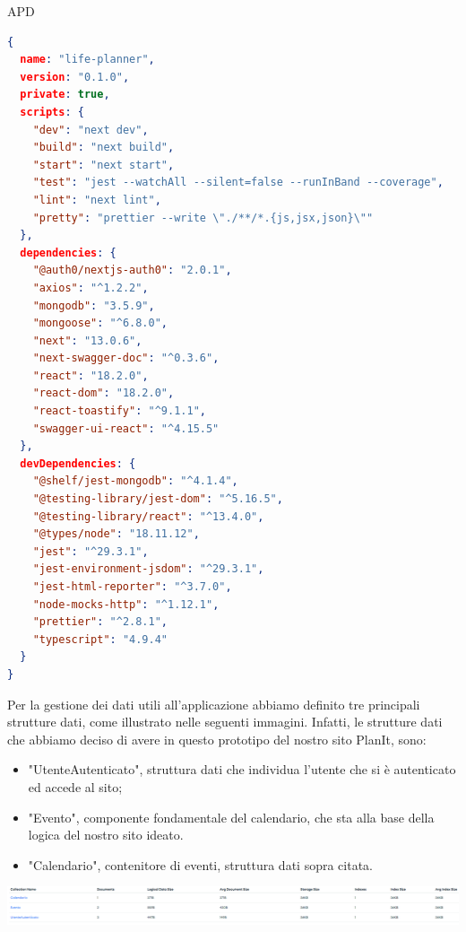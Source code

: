 \begin{listaPersonale} {APD}
    \begin{lstlisting}[language=json,firstnumber=1]
{
  name: "life-planner",
  version: "0.1.0",
  private: true,
  scripts: {
    "dev": "next dev",
    "build": "next build",
    "start": "next start",
    "test": "jest --watchAll --silent=false --runInBand --coverage",
    "lint": "next lint",
    "pretty": "prettier --write \"./**/*.{js,jsx,json}\""
  },
  dependencies: {
    "@auth0/nextjs-auth0": "2.0.1",
    "axios": "^1.2.2",
    "mongodb": "3.5.9",
    "mongoose": "^6.8.0",
    "next": "13.0.6",
    "next-swagger-doc": "^0.3.6",
    "react": "18.2.0",
    "react-dom": "18.2.0",
    "react-toastify": "^9.1.1",
    "swagger-ui-react": "^4.15.5"
  },
  devDependencies: {
    "@shelf/jest-mongodb": "^4.1.4",
    "@testing-library/jest-dom": "^5.16.5",
    "@testing-library/react": "^13.4.0",
    "@types/node": "18.11.12",
    "jest": "^29.3.1",
    "jest-environment-jsdom": "^29.3.1",
    "jest-html-reporter": "^3.7.0",
    "node-mocks-http": "^1.12.1",
    "prettier": "^2.8.1",
    "typescript": "4.9.4"
  }
}
    \end{lstlisting}
    \newpage
    Per la gestione dei dati utili all'applicazione abbiamo definito tre principali strutture dati, come illustrato nelle seguenti immagini. Infatti, le strutture dati che abbiamo deciso di avere in questo prototipo del nostro sito PlanIt, sono:
    \begin{itemize}
        \item "UtenteAutenticato", struttura dati che individua l'utente che si è autenticato ed accede al sito;
        \item "Evento", componente fondamentale del calendario, che sta alla base della logica del nostro sito ideato.
        \item "Calendario", contenitore di eventi, struttura dati sopra citata.
    \end{itemize}
    \begin{center}
        \includegraphics[width=1.1\textwidth, height=0.07\textheight]{img/png/DB/collections.png}
    \end{center}

\end{listaPersonale}
